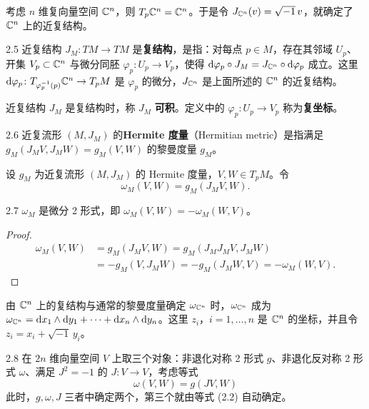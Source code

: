 考虑 $n$ 维复向量空间 $\mathbb{C}^n$，则 $T_p\mathbb{C}^n=\mathbb{C}^n$。于是令 $J_{\mathbb{C}^n}(v)=\sqrt{-1}\,v$，就确定了 $\mathbb{C}^n$ 上的近复结构。

\begin{definition}{2.5}
  近复结构 $J_M\colon TM\to TM$ 是\textbf{复结构}，是指：对每点 $p\in M$，存在其邻域 $U_p$、开集 $V_p\subset\mathbb{C}^n$ 与微分同胚 $\varphi_p\colon U_p\to V_p$，使得 $\mathrm{d}\varphi_p\circ J_M=J_{\mathbb{C}^n}\circ\mathrm{d}\varphi_p$ 成立。这里 $\mathrm{d}\varphi_p\colon T_{\varphi_p^{-1}(p)}\mathbb{C}^n\to T_pM$ 是 $\varphi_p$ 的微分，$J_{\mathbb{C}^n}$ 是上面所述的 $\mathbb{C}^n$ 的近复结构。
\end{definition}

近复结构 $J_M$ 是复结构时，称 $J_M$ \textbf{可积}。定义中的 $\varphi_p\colon U_p\to V_p$ 称为\textbf{复坐标}。

\begin{definition}{2.6}
  近复流形 $(M,J_M)$ 的\textbf{Hermite 度量}（Hermitian metric）是指满足 $g_M(J_MV,J_MW)=g_M(V,W)$ 的黎曼度量 $g_M$。
\end{definition}

设 $g_M$ 为近复流形 $(M,J_M)$ 的 Hermite 度量，$V,W\in T_pM$。令
\[
  \omega_M(V,W)=g_M(J_MV,W).
\]

\begin{lemma*}{2.7}
  $\omega_M$ 是微分 2 形式，即 $\omega_M(V,W)=-\omega_M(W,V)$。
\end{lemma*}

\begin{proof}
  \begin{align*}
    \omega_M(V,W)&=g_M(J_MV,W)=g_M(J_MJ_MV,J_MW)\\
    &=-g_M(V,J_MW)=-g_M(J_MW,V)=-\omega_M(W,V).
  \end{align*}
\end{proof}

由 $\mathbb{C}^n$ 上的复结构与通常的黎曼度量确定 $\omega_{\mathbb{C}^n}$ 时，$\omega_{\mathbb{C}^n}$ 成为 $\omega_{\mathbb{C}^n}=\mathrm{d} x_1\wedge\mathrm{d} y_1+\cdots+\mathrm{d} x_n\wedge\mathrm{d} y_n$。这里 $z_i$，$i=1,\dots,n$ 是 $\mathbb{C}^n$ 的坐标，并且令 $z_i=x_i+\sqrt{-1}\,y_i$。

\begin{remark}{2.8}
  在 $2n$ 维向量空间 $V$ 上取三个对象：非退化对称 2 形式 $g$、非退化反对称 2 形式 $\omega$、满足 $J^2=-1$ 的 $J\colon V\to V$，考虑等式
  \begin{equation}
    \omega(V,W)=g(JV,W) \tag{2.2}
  \end{equation}
  此时，$g,\omega,J$ 三者中确定两个，第三个就由等式 (2.2) 自动确定。
\end{remark}

